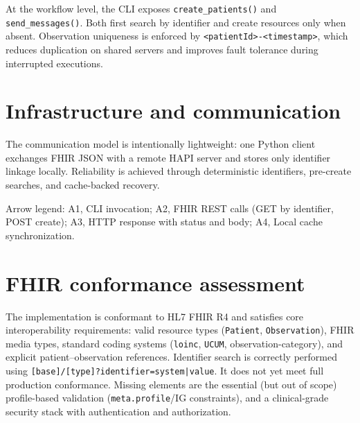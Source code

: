 \documentclass[conference]{IEEEtran}
\begin{document}
At the workflow level, the CLI exposes \texttt{create\_patients()} and 
\texttt{send\_messages()}. Both first search by identifier and create 
resources only when absent. Observation uniqueness is enforced 
by \texttt{<patientId>-<timestamp>}, which reduces duplication 
on shared servers and improves fault tolerance during interrupted executions.

\section{Infrastructure and communication}
\begin{center}
\end{center}

The communication model is intentionally lightweight: 
one Python client exchanges FHIR JSON with a remote 
HAPI server and stores only identifier linkage locally. 
Reliability is achieved through deterministic identifiers, 
pre-create searches, and cache-backed recovery.

Arrow legend: A1, CLI invocation; A2, FHIR REST calls 
(GET by identifier, POST create); A3, HTTP response with status and 
body; A4, Local cache synchronization.

\section{FHIR conformance assessment}
The implementation is conformant to HL7 FHIR R4 
and satisfies core interoperability requirements: 
valid resource types (\texttt{Patient}, \texttt{Observation}), 
FHIR media types, standard coding systems 
(\texttt{loinc}, \texttt{UCUM}, observation-category), and 
explicit patient--observation references. Identifier search
is correctly performed using \texttt{[base]/[type]?identifier=system|value}.
It does not yet meet full production conformance. Missing elements 
are the essential (but out of scope) profile-based validation 
(\texttt{meta.profile}/IG constraints), 
and a clinical-grade security stack with 
authentication and authorization.
\end{document}
